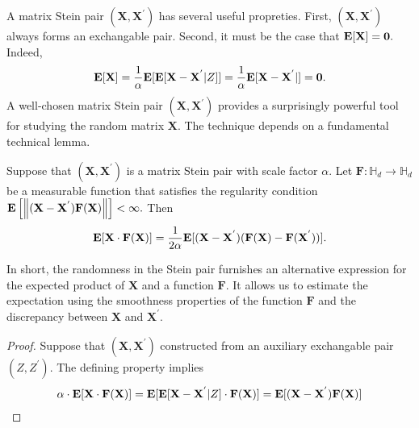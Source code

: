 A matrix Stein pair 
$
(
\mathbf{X}
,
\mathbf{X}^{'}
)
$
has several useful propreties. First,
$
(
\mathbf{X}
,
\mathbf{X}^{'}
)
$
always forms an exchangable pair. Second, it must be the case that
$\mathbf{E}[\mathbf{X}]=\mathbf{0}.$
Indeed,
\begin{gather*}
  \mathbf{E}[\mathbf{X}]
  =
  \frac{1}{\alpha}
  \mathbf{E}[
  \mathbf{E}
  [
    \mathbf{X}
    -
    \mathbf{X}^{'}
    \vert
    Z
  ]
  ]
  =
  \frac{1}{\alpha}
  \mathbf{E}[
    \mathbf{X}
    -
    \mathbf{X}^{'}
    \vert
  ]
  =
  \mathbf{0}
  .
\end{gather*}
A well-chosen matrix Stein pair 
$
(
\mathbf{X}
,
\mathbf{X}^{'}
)
$
provides a surprisingly powerful tool for studying 
the random matrix $\mathbf{X}.$
The technique depends on a fundamental technical lemma.
\begin{lemma}
  Suppose that
  $
  (
    \mathbf{X}
    ,
    \mathbf{X}^{'}
  )
  $
  is a matrix Stein pair with scale factor $\alpha.$
  Let 
  $
    \mathbf{F}
    :
    \mathbb{H}_d
    \to
    \mathbb{H}_d
  $
  be a measurable function that satisfies the regularity condition
  $
  \mathbf{E}
  \left[
  \left\lVert
    (
    \mathbf{X}
    -
    \mathbf{X}^{'}
  )
  \mathbf{F}(\mathbf{X})
  \right\rVert
  \right]
  <
  \infty
  .
  $
  Then
\begin{gather}
  \mathbf{E}
  [
    \mathbf{X}
    \cdot
    \mathbf{F}
    (\mathbf{X})
  ]
  =
  \frac{1}{2\alpha}
  \mathbf{E}
  [
    (
    \mathbf{X}
    -
    \mathbf{X}^{'}
    )
    (
    \mathbf{F}
    (
    \mathbf{X}
    )
    -
    \mathbf{F}
    (
    \mathbf{X}^{'}
    )
  )
  ]
  .
\end{gather}
\end{lemma}
In short, the randomness in the Stein pair furnishes an alternative expression for the expected product of $\mathbf{X}$
and a function $\mathbf{F}.$
It allows us to estimate the expectation using the smoothness properties of the function $\mathbf{F}$ and the discrepancy between $\mathbf{X}$
and $\mathbf{X}^{'}.$
\begin{proof}
  \emph{\cite[Lemma~2.4]{Mackey2014}}
  Suppose that
  $
  (
    \mathbf{X}
    ,
    \mathbf{X}^{'}
  )
  $
  constructed from an auxiliary exchangable pair 
  $
  (
  Z,
  Z^{'}
  )
  .
  $
  The defining property implies
 \begin{gather}
   \alpha \cdot 
   \mathbf{E}[
   \mathbf{X}
   \cdot
   \mathbf{F}
   (\mathbf{X})
   ]
   =
   \mathbf{E}[
    \mathbf{E}[
    \mathbf{X}
    -
    \mathbf{X}^{'}
    \vert
    Z
    ]
    \cdot
   \mathbf{F}
   (\mathbf{X})
   ]
   =
    \mathbf{E}[
    (
    \mathbf{X}
    -
    \mathbf{X}^{'}
    )
   \mathbf{F}
   (\mathbf{X})
   ]
 \end{gather} 
\end{proof}
